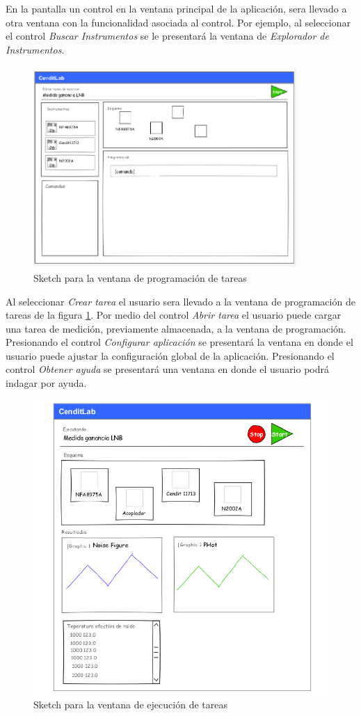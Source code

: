 \documentclass[paper=a4,oneside,fontsize=12pt]{article}
\begin{document}
	En la pantalla un control en la ventana principal de la aplicación, sera llevado a otra ventana con la funcionalidad asociada al control. Por ejemplo, al seleccionar el control \emph{Buscar Instrumentos} se le presentará la ventana de \emph{Explorador de Instrumentos}. 
	
	\begin{figure}[H]
		\centering 
		\includegraphics[width=10cm]{Imagenes/ProgramWindowUI.pdf}
		\caption{Sketch para la ventana de programación de tareas}
		\label{Fig:ProgramWindowUI} 		
	\end{figure}
	
	Al seleccionar \emph{Crear tarea} el usuario sera llevado a la ventana de programación de tareas de la figura \ref{Fig:ProgramWindowUI}. Por medio del control \emph{Abrir tarea} el usuario puede cargar una tarea de medición, previamente almacenada, a la ventana de programación. Presionando el control \emph{Configurar aplicación} se presentará la ventana en donde el usuario puede ajustar la configuración global de la aplicación. Presionando el control \emph{Obtener ayuda} se presentará una ventana en donde el usuario podrá indagar por ayuda.

	\begin{figure}[H]
		\centering 
		\includegraphics[width=12cm]{Imagenes/ExecutionWindowUI.pdf}
		\caption{Sketch para la ventana de ejecución de tareas}
		\label{Fig:ExecutionWindowUI} 		
	\end{figure}
\end{document}
